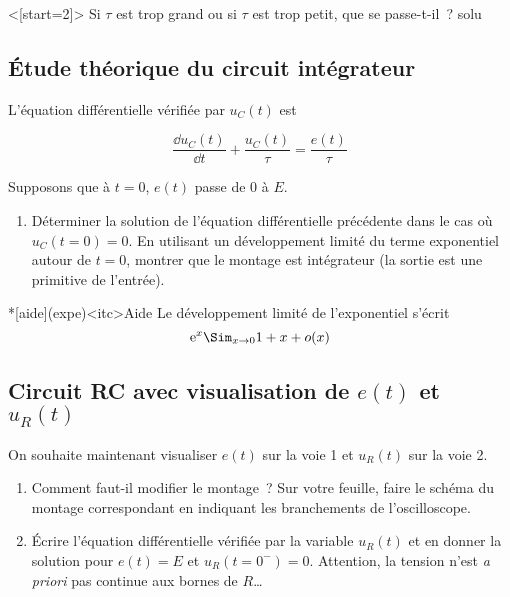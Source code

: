 \documentclass[../main/main.tex]{subfiles}
\begin{document}
\QR<[start=2]>{%
	Si $\tau$ est trop grand ou si $\tau$ est trop petit, que se
	passe-t-il~?
}{%
	solu
}




\subsection{Étude théorique du circuit intégrateur}
\label{ssec:cint}

L'équation différentielle vérifiée par $u_{C}(t)$ est

\[\frac{\dd u_{C}(t)}{\dd t} + \frac{u_{C}(t)}{\tau} = \frac{e(t)}{\tau}\]

Supposons que à $t=0$, $e(t)$ passe de $0$ à $E$.

\begin{enumerate}[label=\clenumi, resume]
	\item \label{q:sol}
	      Déterminer la solution de l'équation différentielle précédente dans
	      le cas où $u_{C}(t=0) = 0$. En utilisant un développement limité du
	      terme exponentiel autour de $t = 0$, montrer que le montage est
	      intégrateur (la sortie est une primitive de l'entrée).
\end{enumerate}

\medskip

\begin{tcb}*[aide](expe)<itc>{Aide}
	Le développement limité de l'exponentiel s'écrit
	\[\text{e}^x \Sim_{x \to 0} 1+x + o(x)\]
\end{tcb}

\subsection{Circuit RC avec visualisation de $e(t)$ et $u_{R}(t)$}
\label{ssec:uR}

On souhaite maintenant visualiser $e(t)$ sur la voie 1 et $u_{R}(t)$ sur la voie
2.

\begin{enumerate}[label=\clenumi, resume]
	\item Comment faut-il modifier le montage~? Sur votre feuille, faire le
	      schéma du montage correspondant en indiquant les branchements de
	      l'oscilloscope.
	\item Écrire l'équation différentielle vérifiée par la variable $u_{R}(t)$
	      et en donner la solution pour $e(t) = E$ et $u_{R}(t=0^-) = 0$.
	      Attention, la tension n'est \textit{a priori} pas continue aux bornes de
	      $R$…
\end{enumerate}
\end{document}
